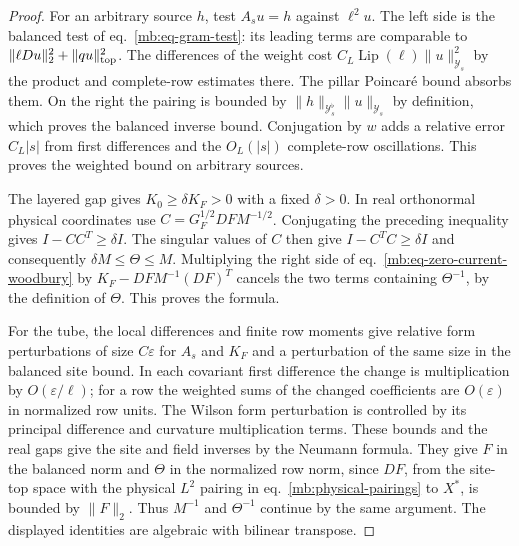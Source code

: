 \documentclass[11pt,letterpaper,reqno]{amsart}
\numberwithin{equation}{section}
\renewcommand{\eqref}[1]{\textup{eq.~\ref{#1}}}
\theoremstyle{definition}
\theoremstyle{remark}
\begin{document}
\begin{proof}
For an arbitrary source \(h\), test \(A_su=h\) against \(\ell^2u\). The left side is the balanced test of \eqref{mb:eq-gram-test}: its leading terms are comparable to \(\|\ell Du\|_2^2+\|qu\|_{\rm top}^2\). The differences of the weight cost \(C_L\operatorname{Lip}(\ell)\|u\|_{\mathcal Y_s}^2\) by the product and complete-row estimates there. The pillar Poincar\'e bound absorbs them. On the right the pairing is bounded by \(\|h\|_{\mathcal Y_s^\flat}\|u\|_{\mathcal Y_s}\) by definition, which proves the balanced inverse bound. Conjugation by \(w\) adds a relative error \(C_L|s|\) from first differences and the \(O_L(|s|)\) complete-row oscillations. This proves the weighted bound on arbitrary sources.

The layered gap gives \(K_0\ge\delta K_F>0\) with a fixed \(\delta>0\). In real orthonormal physical coordinates use \(C=G_F^{1/2}DFM^{-1/2}\). Conjugating the preceding inequality gives \(I-CC^T\ge\delta I\). The singular values of \(C\) then give \(I-C^TC\ge\delta I\) and consequently \(\delta M\le\Theta\le M\). Multiplying the right side of \eqref{mb:eq-zero-current-woodbury} by \(K_F-DFM^{-1}(DF)^T\) cancels the two terms containing \(\Theta^{-1}\), by the definition of \(\Theta\). This proves the formula.

For the tube, the local differences and finite row moments give relative form perturbations of size \(C\varepsilon\) for \(A_s\) and \(K_F\) and a perturbation of the same size in the balanced site bound. In each covariant first difference the change is multiplication by \(O(\varepsilon/\ell)\); for a row the weighted sums of the changed coefficients are \(O(\varepsilon)\) in normalized row units. The Wilson form perturbation is controlled by its principal difference and curvature multiplication terms. These bounds and the real gaps give the site and field inverses by the Neumann formula. They give \(F\) in the balanced norm and \(\Theta\) in the normalized row norm, since \(DF\), from the site-top space with the physical \(L^2\) pairing in \eqref{mb:physical-pairings} to \(X^*\), is bounded by \(\|F\|_2\). Thus \(M^{-1}\) and \(\Theta^{-1}\) continue by the same argument. The displayed identities are algebraic with bilinear transpose.
\end{proof}
\end{document}
